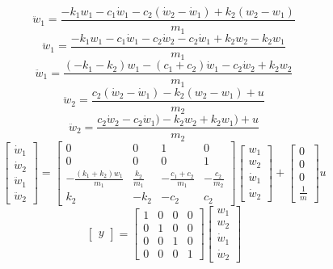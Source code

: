   \begin{equation}
    \ddot w_1 = \frac{-k_1w_1 - c_1\dot w_1 - c_2(\dot w_2-\dot w_1) + k_2(w_2 - w_1)}{m_1}
  \end{equation}
  \begin{equation}
    \ddot w_1 = \frac{-k_1w_1 - c_1\dot w_1 - c_2\dot w_2-c_2\dot w_1 + k_2w_2 - k_2w_1}{m_1}
  \end{equation}
  \begin{equation}
    \ddot w_1 = \frac{(-k_1-k_2)w_1 - (c_1+c_2)\dot w_1 - c_2\dot w_2 + k_2w_2}{m_1}
  \end{equation}
  \begin{equation}
    \ddot w_2 = \frac{c_2(\dot w_2-\dot w_1) - k_2(w_2 - w_1) + u}{m_2}
  \end{equation}
  \begin{equation}
    \ddot w_2 = \frac{c_2\dot w_2 - c_2\dot w_1) - k_2w_2 + k_2w_1) + u}{m_2}
  \end{equation}
  \begin{equation}
    \begin{bmatrix}
      \dot w_1 \\
      \dot w_2 \\
      \ddot w_1 \\
      \ddot w_2
    \end{bmatrix} =
    \begin{bmatrix}
      0 & 0 & 1 & 0 \\
      0 & 0 & 0 & 1 \\
      -\frac{(k_1+k_2)w_1}{m_1} & \frac{k_2}{m_1} & -\frac{c_1+c_2}{m_1} & -\frac{c_2}{m_2} \\
      k_2 & -k_2 & -c_2 & c_2
    \end{bmatrix}
    \begin{bmatrix}
      w_1 \\
      w_2 \\
      \dot w_1 \\
      \dot w_2
    \end{bmatrix} +
    \begin{bmatrix}
      0 \\
      0 \\
      0 \\
      \frac{1}{m}
    \end{bmatrix}u
  \end{equation}
  \begin{equation}
    \begin{bmatrix}
      y
    \end{bmatrix} =
    \begin{bmatrix}
      1 & 0 & 0 & 0 \\
      0 & 1 & 0 & 0 \\
      0 & 0 & 1 & 0 \\
      0 & 0 & 0 & 1
    \end{bmatrix}
    \begin{bmatrix}
      w_1 \\
      w_2 \\
      \dot w_1 \\
      \dot w_2
    \end{bmatrix}
  \end{equation}

